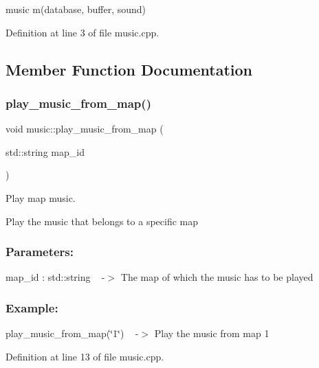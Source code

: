 music m(database, buffer, sound)~\newline


Definition at line 3 of file music.\+cpp.



\subsection{Member Function Documentation}
\mbox{\label{classmusic_ae7835578f75b785e1ef2a3d0db9420b9}} 
\subsubsection{\texorpdfstring{play\+\_\+music\+\_\+from\+\_\+map()}{play\_music\_from\_map()}}
{\footnotesize\ttfamily void music\+::play\+\_\+music\+\_\+from\+\_\+map (\begin{DoxyParamCaption}\item[{std\+::string}]{map\+\_\+id }\end{DoxyParamCaption})}



Play map music. 

Play the music that belongs to a specific map ~\newline
 \subsubsection*{Parameters\+: }

map\+\_\+id \+: std\+::string ~\newline
-\/$>$ The map of which the music has to be played ~\newline
 \subsubsection*{Example\+: }

play\+\_\+music\+\_\+from\+\_\+map(\char`\"{}1\char`\"{}) ~\newline
-\/$>$ Play the music from map 1 ~\newline


Definition at line 13 of file music.\+cpp.


